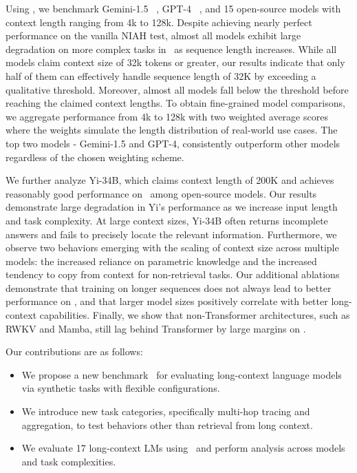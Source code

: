 
Using , we benchmark Gemini-1.5 ~\citep{gemini}, GPT-4 ~\citep{openai2023gpt4}, and 15 open-source models with context length ranging from 4k to 128k. Despite achieving nearly perfect performance on the vanilla NIAH test, almost all models exhibit large degradation on more complex tasks in ~as sequence length increases. While all models claim context size of 32k tokens or greater, our results indicate that only half of them can effectively handle sequence length of 32K by exceeding a qualitative threshold. Moreover, almost all models fall below the threshold before reaching the claimed context lengths.
To obtain fine-grained model comparisons, we aggregate performance from 4k to 128k with two weighted average scores where the weights simulate the length distribution of real-world use cases. The top two models - Gemini-1.5 and GPT-4, consistently outperform other models regardless of the chosen weighting scheme.

We further analyze Yi-34B, which claims context length of 200K and achieves reasonably good performance on ~among open-source models. Our results demonstrate large degradation in Yi's performance as we increase input length and task complexity. At large context sizes, Yi-34B often returns incomplete answers and fails to precisely locate the relevant information. Furthermore, we observe two behaviors emerging with the scaling of context size across multiple models: the increased reliance on parametric knowledge and the increased tendency to copy from context for non-retrieval tasks. Our additional ablations demonstrate that training on longer sequences does not always lead to better performance on , and that larger model sizes positively correlate with better long-context capabilities. Finally, we show that non-Transformer architectures, such as RWKV and Mamba, still lag behind Transformer by large margins on .

Our contributions are as follows:
\begin{itemize}[leftmargin=*]
\vspace{-0.5em}
    \item We propose a new benchmark ~for evaluating long-context language models via synthetic tasks with flexible configurations.  \vspace{-0.2em}
    \item We introduce new task categories, specifically multi-hop tracing and aggregation, to test behaviors other than retrieval from long context. \vspace{-0.2em}
    \item We evaluate 17 long-context LMs using ~and perform analysis across models and task complexities.
\end{itemize}

